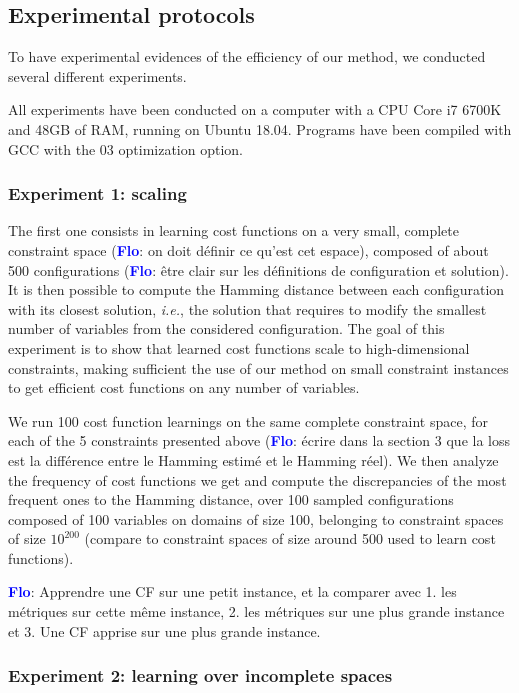 \documentclass{article}
\newcommand{\ie}{\textit{i.e.}}
\newcommand{\flo}{\textcolor{blue}{\bf Flo}\xspace}
\begin{document}
\subsection{Experimental protocols}

To have  experimental evidences  of the efficiency  of our  method, we
conducted several different experiments.

All experiments have  been conducted on a computer with  a CPU Core i7
6700K and  48GB of RAM,  running on  Ubuntu 18.04. Programs  have been
compiled with GCC with the 03 optimization option.

\subsubsection{Experiment 1: scaling}

The first  one consists in  learning cost  functions on a  very small,
complete  constraint  space  (\flo:  on doit  définir  ce  qu'est  cet
espace), composed  of about 500  configurations (\flo: être  clair sur
les définitions de configuration et solution).  It is then possible to
compute  the  Hamming distance  between  each  configuration with  its
closest  solution,  \ie, the  solution  that  requires to  modify  the
smallest number  of variables  from the considered  configuration. The
goal of this  experiment is to show that learned  cost functions scale
to  high-dimensional constraints,  making  sufficient the  use of  our
method on small  constraint instances to get  efficient cost functions
on any number of variables.

We run  100 cost  function learnings on  the same  complete constraint
space, for  each of  the 5 constraints  presented above  (\flo: écrire
dans  la section  3 que  la loss  est la  différence entre  le Hamming
estimé et le Hamming réel). We then analyze
the frequency of  cost functions we get and  compute the discrepancies
of the  most frequent ones to  the Hamming distance, over  100 sampled
configurations  composed of  100  variables on  domains  of size  100,
belonging  to  constraint  spaces   of  size  $10^{200}$  (compare  to
constraint spaces of size around 500 used to learn cost functions).

\flo: Apprendre une CF sur une petit instance, et la comparer avec 1. les
métriques  sur cette  même instance,  2.  les métriques  sur une  plus
grande instance et 3. Une CF apprise sur une plus grande instance.

\subsubsection{Experiment 2: learning over incomplete spaces}
\end{document}
